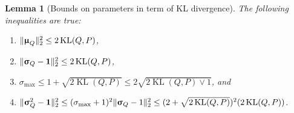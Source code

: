 \documentclass[twoside]{article}
\renewcommand{\ss}[1]{_{\text{#1}}}
\newcommand{\vmu}{\bm{\upmu}}
\newcommand{\vsigma}{\bm{\upsigma}}
\newcommand{\vone}{\mathbf{1}}
\renewcommand{\P}{\mathbb{P}}
\newcommand{\Q}{\mathbb{Q}}
\renewcommand{\Q}{\ensuremath{Q}}
\renewcommand{\P}{\ensuremath{P}}
\newcommand{\KL}{\operatorname{KL}}
\renewcommand{\ss}[1]{_{\text{#1}}}        %
\DeclarePairedDelimiter\norm{\|}{\|}             %
\theoremstyle{theoremstyle}
\newtheorem{lemma}[theorem]{Lemma}
\begin{document}
\begin{lemma}[Bounds on parameters in term of KL divergence] \label{lem:parameter_bound}
    The following inequalities are true:
    \begin{enumerate}
        \item[(i)]
            $\norm{\vmu_\Q}^2_2 \le 2 \KL(\Q, \P)$,
        \item[(ii)]
            $\norm{\vsigma_\Q - \vone}_2^2 \le 2 \KL(\Q, \P)$,
        \item[(iii)]
            $\sigma\ss{max}
             \le 1 + \sqrt{2 \KL(\Q, \P)}
             \le 2 \sqrt{2\KL(\Q, \P) \lor 1}$, and
        \item[(iv)]
            $\norm{\vsigma_\Q^2 - \vone}_2^2
             \le (\sigma\ss{max} + 1)^2 \norm{\vsigma_\Q - 1}_2^2
             \le (2 + \sqrt{2 \KL(\Q, \P)})^2 (2 \KL(\Q, \P))$.
    \end{enumerate}
\end{lemma}
\end{document}
